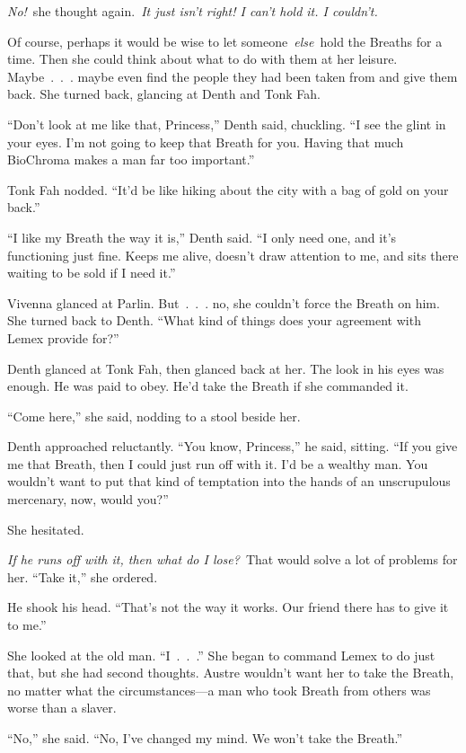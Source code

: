 \textit{No!}~she thought again.~\textit{It just isn’t right! I can’t hold it. I couldn’t.}

Of course, perhaps it would be wise to let someone~\textit{else}~hold the Breaths for a time. Then she could think about what to do with them at her leisure. Maybe~.~.~. maybe even find the people they had been taken from and give them back. She turned back, glancing at Denth and Tonk Fah.

“Don’t look at me like that, Princess,” Denth said, chuckling. “I see the glint in your eyes. I’m not going to keep that Breath for you. Having that much BioChroma makes a man far too important.”

Tonk Fah nodded. “It’d be like hiking about the city with a bag of gold on your back.”

“I like my Breath the way it is,” Denth said. “I only need one, and it’s functioning just fine. Keeps me alive, doesn’t draw attention to me, and sits there waiting to be sold if I need it.”

Vivenna glanced at Parlin. But~.~.~. no, she couldn’t force the Breath on him. She turned back to Denth. “What kind of things does your agreement with Lemex provide for?”

Denth glanced at Tonk Fah, then glanced back at her. The look in his eyes was enough. He was paid to obey. He’d take the Breath if she commanded it.

“Come here,” she said, nodding to a stool beside her.

Denth approached reluctantly. “You know, Princess,” he said, sitting. “If you give me that Breath, then I could just run off with it. I’d be a wealthy man. You wouldn’t want to put that kind of temptation into the hands of an unscrupulous mercenary, now, would you?”

She hesitated.

\textit{If he runs off with it, then what do I lose?}~That would solve a lot of problems for her. “Take it,” she ordered.

He shook his head. “That’s not the way it works. Our friend there has to give it to me.”

She looked at the old man. “I~.~.~.” She began to command Lemex to do just that, but she had second thoughts. Austre wouldn’t want her to take the Breath, no matter what the circumstances—a man who took Breath from others was worse than a slaver.

“No,” she said. “No, I’ve changed my mind. We won’t take the Breath.”

